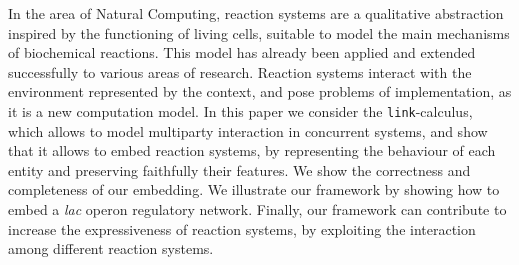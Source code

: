 
In the area of Natural Computing, reaction systems are
a qualitative abstraction inspired by the 
functioning of living cells, suitable to model the main
mechanisms of biochemical reactions.
This model has already been applied
and extended successfully to various areas of research. Reaction 
systems interact with the environment represented by the context, and
pose problems of implementation, as it is a new computation model. 
In this paper we consider the {\tt link}-calculus, which allows to model 
multiparty interaction in concurrent systems, and show that it allows to
embed reaction systems, by representing the behaviour of each entity and
preserving faithfully their features. 
We show the correctness and completeness 
of our embedding.
We illustrate our framework by showing how to embed a \emph{lac} operon 
regulatory network. 
Finally, our framework can contribute to increase the expressiveness
of reaction systems, by exploiting the interaction among 
different reaction systems.
